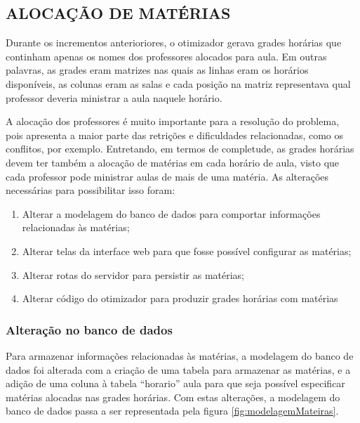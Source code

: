\subsection{ALOCAÇÃO DE MATÉRIAS}

Durante os incrementos anterioriores, o otimizador gerava grades horárias que continham apenas os nomes dos professores alocados para aula. Em outras palavras, as grades eram matrizes nas quais as linhas eram os horários disponíveis, as colunas eram as salas e cada posição na matriz representava qual professor deveria ministrar a aula naquele horário.

A alocação dos professores é muito importante para a resolução do problema, pois apresenta a maior parte das retrições e dificuldades relacionadas, como os conflitos, por exemplo. Entretando, em termos de completude, as grades horárias devem ter também a alocação de matérias em cada horário de aula, visto que cada professor pode ministrar aulas de mais de uma matéria. As alterações necessárias para possibilitar isso foram:

\begin{enumerate}
	\item Alterar a modelagem do banco de dados para comportar informações relacionadas às matérias;
	\item Alterar telas da interface web para que fosse possível configurar as matérias;
	\item Alterar rotas do servidor para persistir as matérias;
	\item Alterar código do otimizador para produzir grades horárias com matérias
\end{enumerate}

\subsubsection{Alteração no banco de dados}
Para armazenar informações relacionadas às matérias, a modelagem do banco de dados foi alterada com a criação de uma tabela para armazenar as matérias, e a adição de uma coluna à tabela ``horario'' aula para que seja possível especificar matérias alocadas nas grades horárias. 
Com estas alterações, a modelagem do banco de dados passa a ser representada pela figura \ref{fig:modelagemMateiras}.

